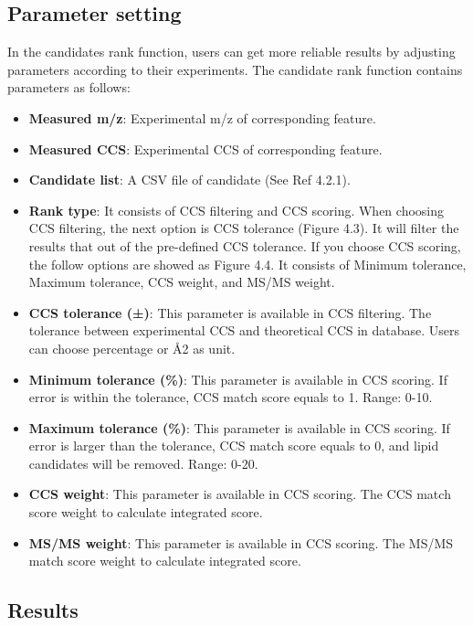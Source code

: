 \documentclass[12pt,]{book}
\providecommand{\tightlist}{%
  \setlength{\itemsep}{0pt}\setlength{\parskip}{0pt}}
\theoremstyle{definition}
\theoremstyle{definition}
\theoremstyle{definition}
\theoremstyle{remark}
\begin{document}
\subsection{Parameter setting}\label{parameter-setting}

In the candidates rank function, users can get more reliable results by
adjusting parameters according to their experiments. The candidate rank
function contains parameters as follows:

\begin{itemize}
\tightlist
\item
  \textbf{Measured m/z}: Experimental m/z of corresponding feature.
\item
  \textbf{Measured CCS}: Experimental CCS of corresponding feature.
\item
  \textbf{Candidate list}: A CSV file of candidate (See Ref 4.2.1).
\item
  \textbf{Rank type}: It consists of CCS filtering and CCS scoring. When
  choosing CCS filtering, the next option is CCS tolerance (Figure 4.3).
  It will filter the results that out of the pre-defined CCS tolerance.
  If you choose CCS scoring, the follow options are showed as Figure
  4.4. It consists of Minimum tolerance, Maximum tolerance, CCS weight,
  and MS/MS weight.
\item
  \textbf{CCS tolerance (±)}: This parameter is available in CCS
  filtering. The tolerance between experimental CCS and theoretical CCS
  in database. Users can choose percentage or Å2 as unit.
\item
  \textbf{Minimum tolerance (\%)}: This parameter is available in CCS
  scoring. If error is within the tolerance, CCS match score equals to
  1. Range: 0-10.
\item
  \textbf{Maximum tolerance (\%)}: This parameter is available in CCS
  scoring. If error is larger than the tolerance, CCS match score equals
  to 0, and lipid candidates will be removed. Range: 0-20.
\item
  \textbf{CCS weight}: This parameter is available in CCS scoring. The
  CCS match score weight to calculate integrated score.
\item
  \textbf{MS/MS weight}: This parameter is available in CCS scoring. The
  MS/MS match score weight to calculate integrated score.
\end{itemize}

\subsection{Results}\label{results}
\end{document}
